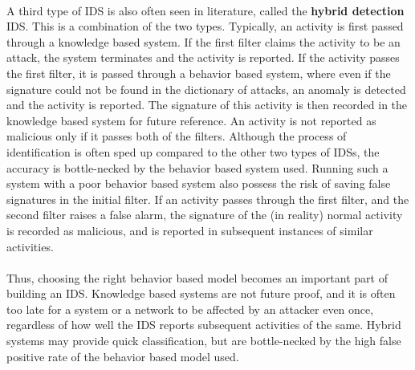 \paragraph{}
A third type of IDS is also often seen in literature, called the \textbf{hybrid detection} IDS. This is a combination of the two types. Typically, an activity is first passed through a knowledge based system. If the first filter claims the activity to be an attack, the system terminates and the activity is reported. If the activity passes the first filter, it is passed through a behavior based system, where even if the signature could not be found in the dictionary of attacks, an anomaly is detected and the activity is reported. The signature of this activity is then recorded in the knowledge based system for future reference. An activity is not reported as malicious only if it passes both of the filters. Although the process of identification is often sped up compared to the other two types of IDSs, the accuracy is bottle-necked by the behavior based system used. Running such a system with a poor behavior based system also possess the risk of saving false signatures in the initial filter. If an activity passes through the first filter, and the second filter raises a false alarm, the signature of the (in reality) normal activity is recorded as malicious, and is reported in subsequent instances of similar activities.

\paragraph{}
Thus, choosing the right behavior based model becomes an important part of building an IDS. Knowledge based systems are not future proof, and it is often too late for a system or a network to be affected by an attacker even once, regardless of how well the IDS reports subsequent activities of the same. Hybrid systems may provide quick classification, but are bottle-necked by the high false positive rate of the behavior based model used.

